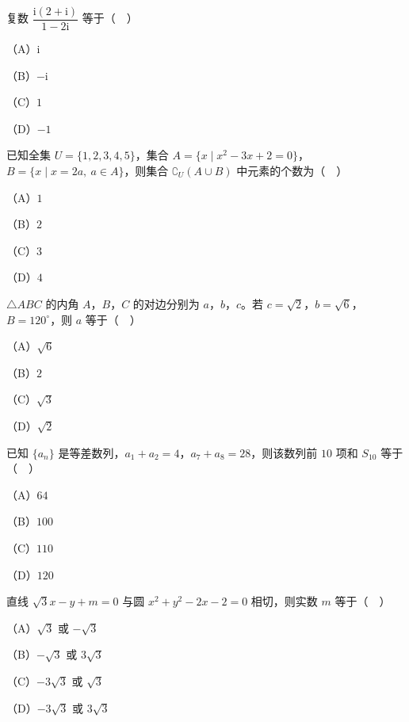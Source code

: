 


\begin{question}
复数 $\dfrac{\mathrm i(2+\mathrm i)}{1-2\mathrm i}$ 等于（　）

（A）$\mathrm i$

（B）$-\mathrm i$

（C）$1$

（D）$-1$

\end{question}
\begin{question}
已知全集 $U=\{1,2,3,4,5\}$，集合 $A=\{x\mid x^2-3x+2=0\}$，$B=\{x\mid x=2a,\ a\in A\}$，则集合 $\complement_U(A\cup B)$ 中元素的个数为（　）

（A）$1$

（B）$2$

（C）$3$

（D）$4$

\end{question}
\begin{question}
$\triangle ABC$ 的内角 $A$，$B$，$C$ 的对边分别为 $a$，$b$，$c$。若 $c=\sqrt2$，$b=\sqrt6$，$B=120^\circ$，则 $a$ 等于（　）

（A）$\sqrt6$

（B）$2$

（C）$\sqrt3$

（D）$\sqrt2$

\end{question}
\begin{question}
已知 $\{a_n\}$ 是等差数列，$a_1+a_2=4$，$a_7+a_8=28$，则该数列前 $10$ 项和 $S_{10}$ 等于（　）

（A）$64$

（B）$100$

（C）$110$

（D）$120$

\end{question}
\begin{question}
直线 $\sqrt3x-y+m=0$ 与圆 $x^2+y^2-2x-2=0$ 相切，则实数 $m$ 等于（　）

（A）$\sqrt3$ 或 $-\sqrt3$

（B）$-\sqrt3$ 或 $3\sqrt3$

（C）$-3\sqrt3$ 或 $\sqrt3$

（D）$-3\sqrt3$ 或 $3\sqrt3$

\end{question}
